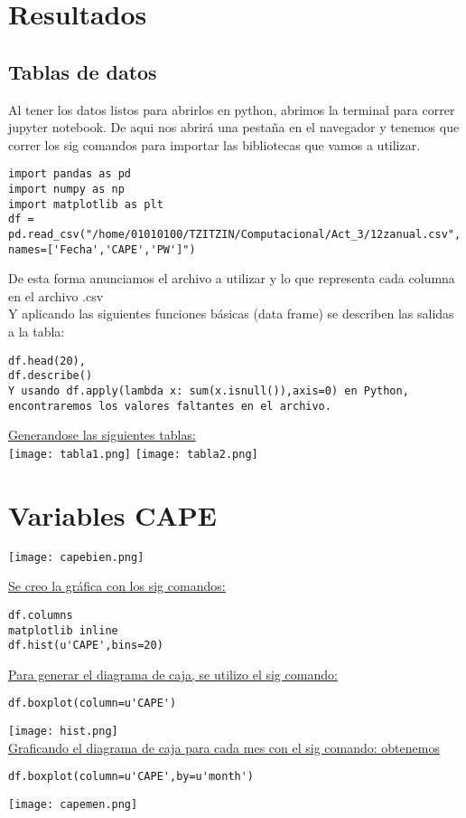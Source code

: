 \documentclass[12pt]{article}
\begin{document}
\section{Resultados}
\subsection{Tablas de datos}
Al tener los datos listos para abrirlos en python, abrimos la terminal para correr jupyter notebook. De aqui nos abrirá una pestaña en el navegador y tenemos que correr los sig comandos para importar las bibliotecas que vamos a utilizar.
\begin{verbatim}
import pandas as pd
import numpy as np
import matplotlib as plt
df = pd.read_csv("/home/01010100/TZITZIN/Computacional/Act_3/12zanual.csv",
names=['Fecha','CAPE','PW']")
\end{verbatim}
De esta forma anunciamos el archivo a utilizar y lo que representa cada columna en el archivo .csv \\
Y aplicando las siguientes funciones básicas (data frame) se describen las salidas a la tabla:
\begin{verbatim}
df.head(20),
df.describe()
Y usando df.apply(lambda x: sum(x.isnull()),axis=0) en Python, 
encontraremos los valores faltantes en el archivo.
    \end{verbatim}
\underline{Generandose las siguientes tablas:}\\

\texttt{[image: tabla1.png]}
\texttt{[image: tabla2.png]}

\section{Variables CAPE}
\texttt{[image: capebien.png]}

\underline{Se creo la gráfica con los sig comandos:}
\begin{verbatim}
df.columns  
matplotlib inline
df.hist(u'CAPE',bins=20)
\end{verbatim}

\underline{Para generar el diagrama de caja, se utilizo el sig comando:}
\begin{verbatim}
df.boxplot(column=u'CAPE')
\end{verbatim}
\texttt{[image: hist.png]} \\
\underline{Graficando el diagrama de caja para cada mes con el sig comando: obtenemos}
\begin{verbatim}
df.boxplot(column=u'CAPE',by=u'month')
\end{verbatim}
\texttt{[image: capemen.png]} \\
\end{document}
